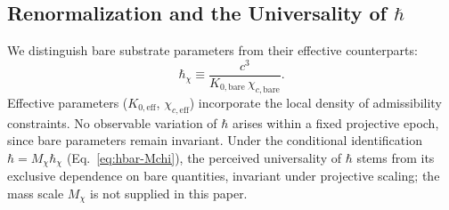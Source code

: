 \subsection{Renormalization and the Universality of \texorpdfstring{$\hbar$}{ℏ}}
  \label{subsec:renormalization-hbar}

  We distinguish bare substrate parameters from their effective counterparts:
  \begin{equation}
    \hbar_\chi \equiv \frac{c^3} {K_{0,\mathrm{bare}}\,\chi_{c,\mathrm{bare}}}.
    \label{eq:hbar-chi}
  \end{equation}
  Effective parameters ($K_{0,\mathrm{eff}}$,
  $\chi_{c,\mathrm{eff}}$) incorporate the local density of admissibility constraints.
  No observable variation of $\hbar$ arises within a fixed projective epoch,
  since bare parameters remain invariant.
  Under the conditional identification $\hbar = M_\chi\hbar_\chi$ (Eq.~\eqref{eq:hbar-Mchi}), the perceived
  universality of $\hbar$ stems from its exclusive dependence on bare quantities, invariant under projective scaling;
  the mass scale $M_\chi$ is not supplied in this paper.
